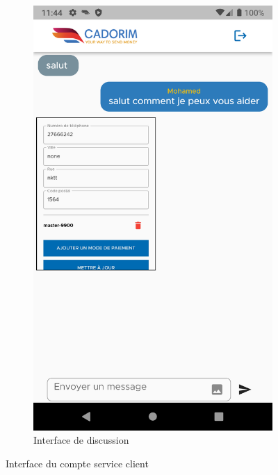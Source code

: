 \begin{itemize}[label=$\ast$]
\begin{figure}
\begin{subfigure}{0.3\textwidth}
	\includegraphics[width=\hsize, valign=m ]{./Template LaTeX/Images/From_emu/b.png}
	\caption{Interface de discussion}
	\label{klk}
\end{subfigure}
	\caption{Interface du compte service client
}
\label{serviceCl}
\end{figure}
\end{itemize}


